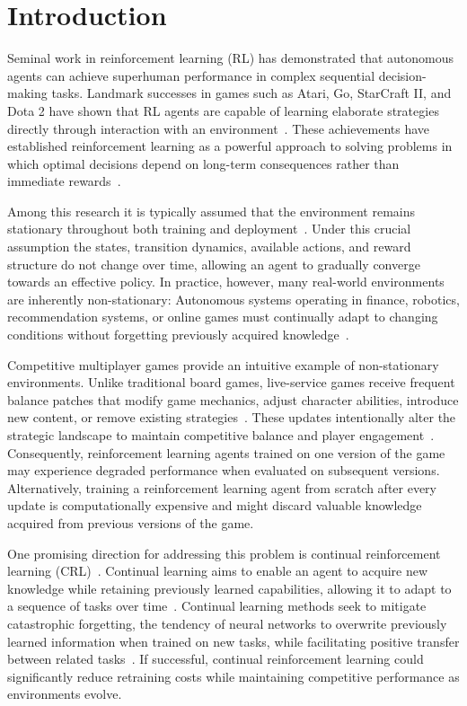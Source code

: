 %
%
\chapter{Introduction} \label{sec:introduction}
Seminal work in reinforcement learning (RL) has demonstrated that autonomous agents can achieve superhuman performance in complex sequential decision-making tasks.
Landmark successes in games such as Atari, Go, StarCraft II, and Dota 2 have shown that RL agents are capable of learning elaborate strategies directly through interaction with an environment~\cite{silver2017alphazero,vinyals2019starcraft,berner2019dota}.
These achievements have established reinforcement learning as a powerful approach to solving problems in which optimal decisions depend on long-term consequences rather than immediate rewards~\cite{silver2017alphazero}.

Among this research it is typically assumed that the environment remains stationary throughout both training and deployment~\cite{sutton2018rl,ditzler2015nonstationary}.
Under this crucial assumption the states, transition dynamics, available actions, and reward structure do not change over time, allowing an agent to gradually converge towards an effective policy.
In practice, however, many real-world environments are inherently non-stationary: Autonomous systems operating in finance, robotics, recommendation systems, or online games must continually adapt to changing conditions without forgetting previously acquired knowledge~\cite{ditzler2015nonstationary,khetarpal2022crl}.

Competitive multiplayer games provide an intuitive example of non-stationary environments.
Unlike traditional board games, live-service games receive frequent balance patches that modify game mechanics, adjust character abilities, introduce new content, or remove existing strategies~\cite{chitayat2023gameupdates}.
These updates intentionally alter the strategic landscape to maintain competitive balance and player engagement~\cite{chitayat2023gameupdates}.
Consequently, reinforcement learning agents trained on one version of the game may experience degraded performance when evaluated on subsequent versions.
Alternatively, training a reinforcement learning agent from scratch after every update is computationally expensive and might discard valuable knowledge acquired from previous versions of the game.

One promising direction for addressing this problem is continual reinforcement learning (CRL)~\cite{khetarpal2022crl,wang2024cl}.
Continual learning aims to enable an agent to acquire new knowledge while retaining previously learned capabilities, allowing it to adapt to a sequence of tasks over time~\cite{wang2024cl}.
Continual learning methods seek to mitigate catastrophic forgetting, the tendency of neural networks to overwrite previously learned information when trained on new tasks, while facilitating positive transfer between related tasks~\cite{wang2024cl,mccloskey1989catastforget}.
If successful, continual reinforcement learning could significantly reduce retraining costs while maintaining competitive performance as environments evolve.

